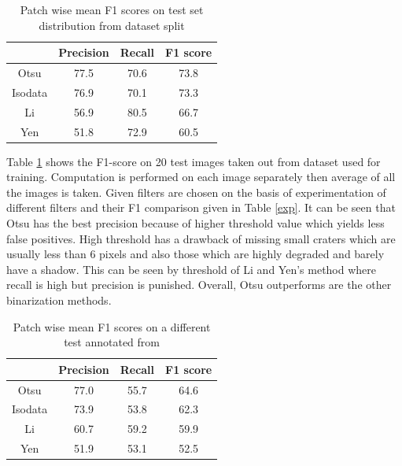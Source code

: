 \documentclass[11pt]{article}
\begin{document}
\begin{table}[H]
	\centering
	\caption{Patch wise mean F1 scores on test set distribution from dataset split}
	\begin{tabular}{c|c|c|c|}
		\cline{2-4}
		\multicolumn{1}{l|}{}         & Precision & Recall & F1 score \\ \hline
		\multicolumn{1}{|c|}{Otsu}    & 77.5      & 70.6   & 73.8     \\ \hline
		\multicolumn{1}{|c|}{Isodata} & 76.9      & 70.1   & 73.3     \\ \hline
		\multicolumn{1}{|c|}{Li}      & 56.9      & 80.5   & 66.7     \\ \hline
		\multicolumn{1}{|c|}{Yen}     & 51.8      & 72.9   & 60.5     \\ \hline
	\end{tabular}
\label{mine}
\end{table}

Table \ref{mine} shows the F1-score on 20 test images taken out from dataset used for training. Computation is performed on each image separately then average of all the images is taken. Given filters are chosen on the basis of experimentation of different filters and their F1 comparison given in Table \ref{exp}. It can be seen that Otsu has the best precision because of higher threshold value which yields less false positives. High threshold has a drawback of missing small craters which are usually less than 6 pixels and also those which are highly degraded and barely have a shadow. This can be seen by threshold of Li and Yen's method where recall is high but precision is punished. Overall, Otsu outperforms are the other binarization methods.

\begin{table}[H]
	\centering
	\caption{Patch wise mean F1 scores on a different test annotated from \cite{dino2020}}
	\begin{tabular}{c|c|c|c|}
		\cline{2-4}
		\multicolumn{1}{l|}{}         & Precision & Recall & F1 score \\ \hline
		\multicolumn{1}{|c|}{Otsu}    & 77.0      & 55.7   & 64.6     \\ \hline
		\multicolumn{1}{|c|}{Isodata} & 73.9      & 53.8   & 62.3     \\ \hline
		\multicolumn{1}{|c|}{Li}      & 60.7      & 59.2   & 59.9     \\ \hline
		\multicolumn{1}{|c|}{Yen}     & 51.9      & 53.1   & 52.5     \\ \hline
	\end{tabular}
\label{dino}
\end{table}
\end{document}
